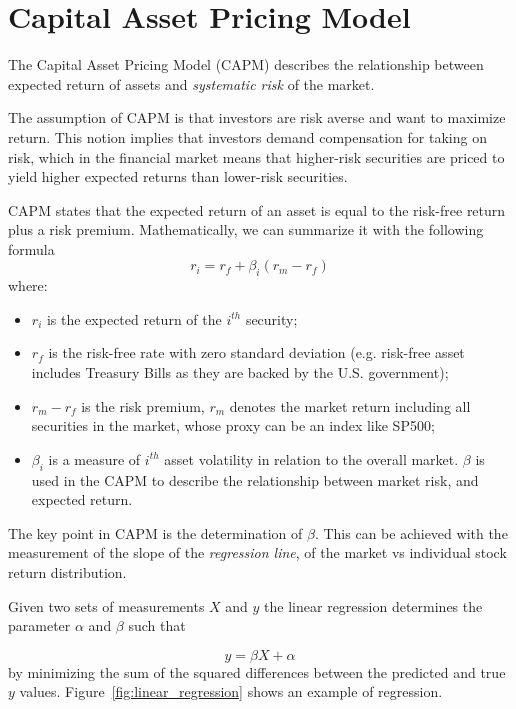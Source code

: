 \section{Capital Asset Pricing Model}
\label{sec:capm}
The Capital Asset Pricing Model (CAPM) describes the relationship between expected return of assets and \emph{systematic risk} of the market.

The assumption of CAPM is that investors are risk averse and want to maximize return. This notion implies that investors demand compensation for taking on risk, which in the financial market means that higher-risk securities are priced to yield higher expected returns than lower-risk securities. 

CAPM states that the expected return of an asset is equal to the risk-free return plus a risk premium. 
Mathematically, we can summarize it with the following formula
\begin{equation}
r_i = r_f + \beta_i(r_m-r_f)
\label{eq:capm}
\end{equation}
where:
\begin{itemize}
	\item $r_i$ is the expected return of the $i^{th}$ security;
	\item $r_f$ is the risk-free rate with zero standard deviation (e.g. risk-free asset includes Treasury Bills as they are backed by the U.S. government);
	\item $r_m - r_f$ is the risk premium, $r_m$ denotes the market return including all securities in the market, whose proxy can be an index like SP500;
	\item $\beta_i$ is a measure of $i^{th}$ asset volatility in relation to the overall market. 
	$\beta$ is used in the CAPM to describe the relationship between market risk, and expected return.
\end{itemize}
	
The key point in CAPM is the determination of $\beta$. This can be achieved with the measurement of the slope of the \emph{regression line}, of the market vs individual stock return distribution.

Given two sets of measurements $X$ and $y$ the linear regression determines the parameter $\alpha$ and $\beta$ such that

\begin{equation}
	y=\beta X + \alpha
\end{equation}
by minimizing the sum of the squared differences between the predicted and true $y$ values.
Figure~\ref{fig:linear_regression} shows an example of regression.

